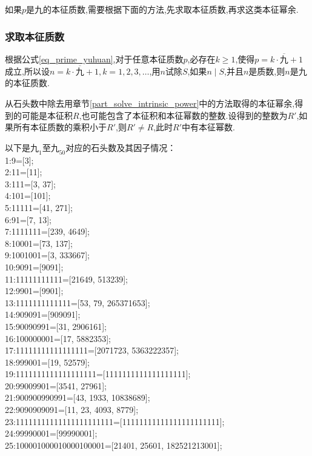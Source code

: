 \documentclass[a4paper]{article}
\numberwithin{equation}{section}
\begin{document}
如果$p$是$九$的本征质数,需要根据下面的方法,先求取本征质数,再求这类本征幂余.

\subsubsection{求取本征质数}
根据公式\ref{eq_prime_yuhuan},对于任意本征质数$p$,必存在$k \ge 1$,使得$p=k\cdot \overline{九} +1$成立,所以设$n=k\cdot \overline{九} +1,k=1,2,3,\dots$,用$n$试除$S$,如果$n \mid S$,并且$n$是质数,则$n$是九的本征质数.

从石头数中除去用章节\ref{part_solve_intrinsic_power}中的方法取得的本征幂余,得到的可能是本征积$R$,也可能包含了本征积和本征幂数的整数.设得到的整数为$R'$,如果所有本征质数的乘积小于$R'$,则$R' \ne R$,此时$R'$中有本征幂数.


\indent 以下是$九_1$至$九_{50}$对应的石头数及其因子情况：\\
 1:9=[3]; \\
 2:11=[11]; \\
 3:111=[3, 37];\\
 4:101=[101];\\
 5:11111=[41, 271];\\
 6:91=[7, 13];\\
 7:1111111=[239, 4649];\\
 8:10001=[73, 137];\\
 9:1001001=[3, 333667];\\
 10:9091=[9091];\\
 11:11111111111=[21649, 513239];\\
 12:9901=[9901];\\
 13:1111111111111=[53, 79, 265371653];\\
 14:909091=[909091];\\
 15:90090991=[31, 2906161];\\
 16:100000001=[17, 5882353];\\
 17:11111111111111111=[2071723, 5363222357];\\
 18:999001=[19, 52579];\\
 19:1111111111111111111=[1111111111111111111];\\
 20:99009901=[3541, 27961];\\
 21:900900990991=[43, 1933, 10838689];\\
 22:9090909091=[11, 23, 4093, 8779];\\
 23:11111111111111111111111=[11111111111111111111111];\\
 24:99990001=[99990001];\\
 25:100001000010000100001=[21401, 25601, 182521213001];\\
\end{document}
